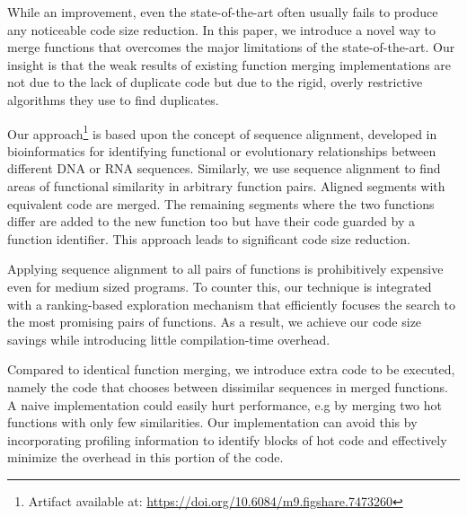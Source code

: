 While an improvement, even the state-of-the-art often usually fails to produce any
noticeable code size reduction. In this paper, we introduce a novel way to merge
functions that overcomes the major limitations of the state-of-the-art. Our
insight is that the weak results of existing function merging implementations
are not due to the lack of duplicate code but due to the rigid, overly restrictive
algorithms they use to find duplicates.

Our approach\footnote{Artifact available at: \url{https://doi.org/10.6084/m9.figshare.7473260}}
is based upon the concept of sequence alignment, developed in
bioinformatics for identifying functional or evolutionary relationships between
different DNA or RNA sequences. Similarly, we use sequence alignment to find
areas of functional similarity in arbitrary function pairs. Aligned segments
with equivalent code are merged. The remaining segments where the two functions
differ are added to the new function too but have their code guarded by a
function identifier. This approach leads to significant code size reduction.

Applying sequence alignment to all pairs of functions is prohibitively expensive
even for medium sized programs. To counter this, our technique is integrated with
a ranking-based exploration mechanism that efficiently focuses the search to the most
promising pairs of functions. %
As a result, we achieve our code size savings while introducing little compilation-time
overhead.

Compared to identical function merging, we introduce extra code to be executed,
namely the code that chooses between dissimilar sequences in merged functions.
A naive implementation could easily hurt performance, e.g by merging two hot functions
with only few similarities. Our implementation can avoid this by incorporating
profiling information to identify blocks of hot code and effectively minimize 
the overhead in this portion of the code.

